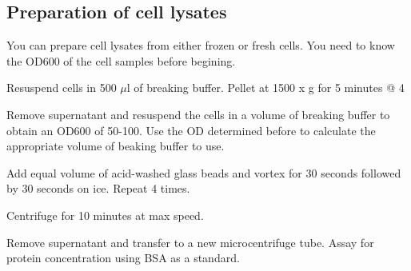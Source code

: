 \documentclass[a4paper,12pt]{article}
\newenvironment{packed_enum}{
\begin{enumerate}
  \setlength{\itemsep}{1pt}
  \setlength{\parskip}{0pt}
  \setlength{\parsep}{0pt}
}{\end{enumerate}}
\begin{document}
	\subsection{Preparation of cell lysates}
	\begin{packed_enum}
		\item You can prepare cell lysates from  either frozen or fresh cells. You need to know the OD{\scriptsize600} of the cell samples before begining.
		\item Resuspend cells in 500 $\mu$l of breaking buffer. Pellet at 1500 x g for 5 minutes @ 4\textcelsius
		\item Remove supernatant and resuspend the cells in a volume of breaking buffer to obtain an OD{\scriptsize 600} of 50-100. Use the OD determined before to calculate the appropriate volume of beaking buffer to use.
		\item Add equal volume of acid-washed glass beads and vortex for 30 seconds followed by 30 seconds on ice. Repeat 4 times.
		\item Centrifuge for 10 minutes at max speed.
		\item Remove supernatant and transfer to a new microcentrifuge tube. Assay for protein concentration using BSA as a standard.
		
	\end{packed_enum}
\end{document}
